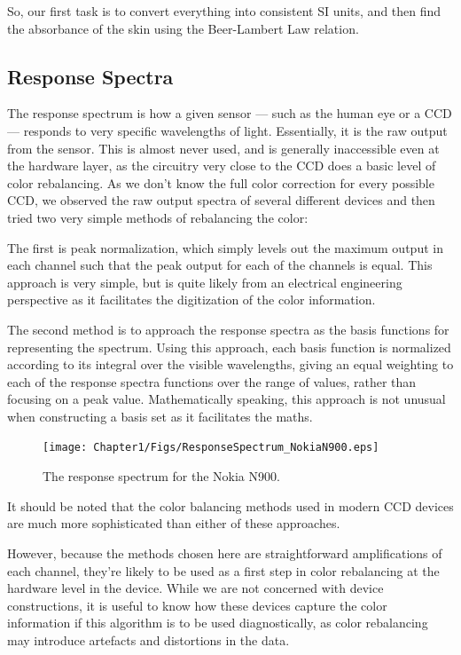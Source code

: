 So, our first task is to convert everything into consistent SI units, and then find the absorbance of the skin using the Beer-Lambert Law relation.

\subsection{Response Spectra}

The response spectrum is how a given sensor --- such as the human eye or a CCD --- responds to very specific wavelengths of light. Essentially, it is the raw output from the sensor. This is almost never used, and is generally inaccessible even at the hardware layer, as the circuitry very close to the CCD does a basic level of color rebalancing. As we don't know the full color correction for every possible CCD, we observed the raw output spectra of several different devices and then tried two very simple methods of rebalancing the color:

The first is peak normalization, which simply levels out the maximum output in each channel such that the peak output for each of the channels is equal. This approach is very simple, but is quite likely from an electrical engineering perspective as it facilitates the digitization of the color information.

The second method is to approach the response spectra as the basis functions for representing the spectrum. Using this approach, each basis function is normalized according to its integral over the visible wavelengths, giving an equal weighting to each of the response spectra functions over the range of values, rather than focusing on a peak value. Mathematically speaking, this approach is not unusual when constructing a basis set as it facilitates the maths.


\begin{figure}[h!]
  \centering
    \texttt{[image: Chapter1/Figs/ResponseSpectrum\_NokiaN900.eps]}
    \caption{The response spectrum for the Nokia N900. }  \label{fig:ResponseSpectumNokia}
\end{figure}



It should be noted that the color balancing methods used in modern CCD devices are much more sophisticated than either of these approaches.

However, because the methods chosen here are straightforward amplifications of each channel, they're likely to be used as a first step in color rebalancing at the hardware level in the device. While we are not concerned with device constructions, it is useful to know how these devices capture the color information if this algorithm is to be used diagnostically, as color rebalancing may introduce artefacts and distortions in the data.


